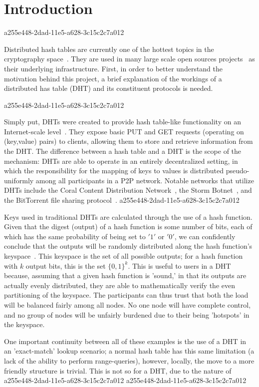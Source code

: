 \documentclass[12pt]{article}
\begin{document}
\section{Introduction}
a255e448-2dad-11e5-a628-3c15c2c7a012\par Distributed hash tables are currently one of the hottest topics in the cryptography space~\cite{Stoica:2001dj,Rowstron:2001ea,Ratnasamy:2001wn}. They are used in many large scale open sources projects~\cite{Freitas:2013tb,Xu:2010vs,Perfitt:2010fh} as their underlying infrastructure. First, in order to better understand the motivation behind this project, a brief explanation of the workings of a distributed has table (DHT) and its constituent protocols is needed.

a255e448-2dad-11e5-a628-3c15c2c7a012\par Simply put, DHTs were created to provide hash table-like functionality on an Internet-scale level~\cite{Ratnasamy:2001wn}. They expose basic PUT and GET requests (operating on (key,value) pairs) to clients, allowing them to store and retrieve information from the DHT. The difference between a hash table and a DHT is the scope of the mechanism: DHTs are able to operate in an entirely decentralized setting, in which the responsibility for the mapping of keys to values is distributed pseudo-uniformly among all participants in a P2P network. Notable networks that utilize DHTs include the Coral Content Distribution Network~\cite{Freedman:2004vb}, the Storm Botnet~\cite{Holz:2008uk}, and the BitTorrent file sharing protocol~\cite{Cohen:y1_8mBnw}.
a255e448-2dad-11e5-a628-3c15c2c7a012
\par Keys used in traditional DHTs are calculated through the use of a hash function. Given that the digest (output) of a hash function is some number of bits, each of which has the same probability of being set to $'1'$ or $'0'$, we can confidently conclude that the outputs will be randomly distributed along the hash function's keyspace~. This keyspace is the set of all possible outputs; for a hash function with $k$ output bits, this is the set $\{0,1\}^k$. This is useful to users in a DHT because, assuming that a given hash function is 'sound,' in that its outputs are actually evenly distributed, they are able to mathematically verify the even partitioning of the keyspace. The participants can thus trust that both the load will be balanced fairly among all nodes. No one node will have complete control, and no group of nodes will be unfairly burdened due to their being 'hotspots' in the keyspace.~

\par One important continuity between all of these examples is the use of a DHT in an 'exact-match' lookup scenario; a normal hash table has this same limitation (a lack of the ability to perform range-queries), however, locally, the move to a more friendly structure is trivial. This is not so for a DHT, due to the nature of
a255e448-2dad-11e5-a628-3c15c2c7a012\printbibliography
a255e448-2dad-11e5-a628-3c15c2c7a012
\end{document}
